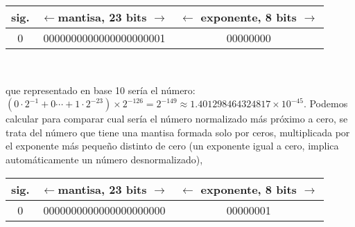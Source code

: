 \begin{tabular}{|c||c||c|}
\hline
sig.&$\leftarrow$mantisa, 23 bits $\rightarrow$&$\leftarrow$ exponente, 8 bits $\rightarrow$\\
\hline
0&0000000000000000000001&00000000\\
\hline
\end{tabular}\\

\begin{paracol}{2}
que representado en base 10 sería el número: $(0\cdot2^{-1}+0\cdots+1\cdot2^{-23})\times 2^{-126}=2^{-149}\approx 1.401298464324817\times10^{-45}$. Podemos calcular para comparar cual sería el número normalizado más próximo a cero, se trata del número que tiene una mantisa formada solo por ceros, multiplicada por el exponente más pequeño distinto de cero (un exponente igual a cero, implica automáticamente un número desnormalizado),\\ 
\end{paracol}

\begin{tabular}{|c||c||c|}
\hline
sig.&$\leftarrow$mantisa, 23 bits $\rightarrow$&$\leftarrow$ exponente, 8 bits $\rightarrow$\\
\hline
0&0000000000000000000000&00000001\\
\hline
\end{tabular}\\

